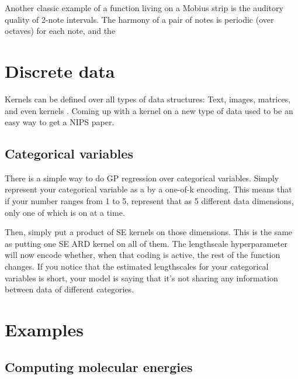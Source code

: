 Another classic example of a function living on a Mobius strip is the auditory quality of 2-note intervals.  The harmony of a pair of notes is periodic (over octaves) for each note, and the 


\section{Discrete data}

Kernels can be defined over all types of data structures: Text, images, matrices, and even kernels . Coming up with a kernel on a new type of data used to be an easy way to get a NIPS paper.

\subsection{Categorical variables}

There is a simple way to do GP regression over categorical variables. Simply represent your categorical variable as a by a one-of-k encoding. This means that if your number ranges from 1 to 5, represent that as 5 different data dimensions, only one of which is on at a time. 

Then, simply put a product of SE kernels on those dimensions. This is the same as putting one SE ARD kernel on all of them. The lengthscale hyperparameter will now encode whether, when that coding is active, the rest of the function changes. If you notice that the estimated lengthscales for your categorical variables is short, your model is saying that it's not sharing any information between data of different categories. 



\section{Examples}

\subsection{Computing molecular energies}

